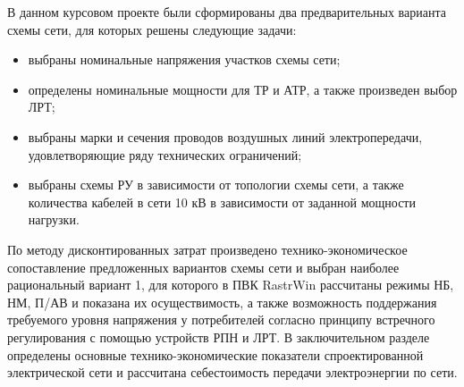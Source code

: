 \Conclusion

В данном курсовом проекте были сформированы два предварительных варианта схемы сети, для которых решены следующие задачи:
\begin{itemize}
\item выбраны номинальные напряжения участков схемы сети; 
\item определены номинальные мощности для ТР и АТР, а также произведен выбор ЛРТ;
\item выбраны марки и сечения проводов воздушных линий электропередачи, удовлетворяющие ряду технических ограничений;
\item выбраны схемы РУ в зависимости от топологии схемы сети, а также количества кабелей в сети 10 кВ в зависимости от заданной мощности нагрузки.
\end{itemize}
По методу дисконтированных затрат произведено технико-экономическое сопоставление предложенных вариантов схемы сети и выбран наиболее рациональный вариант 1, для которого в ПВК RastrWin рассчитаны режимы НБ, НМ, П/АВ и показана их осуществимость, а также возможность поддержания требуемого уровня напряжения у потребителей согласно принципу встречного регулирования с помощью устройств РПН и ЛРТ.
В заключительном разделе определены основные технико-экономические показатели спроектированной электрической сети и рассчитана себестоимость передачи электроэнергии по сети.